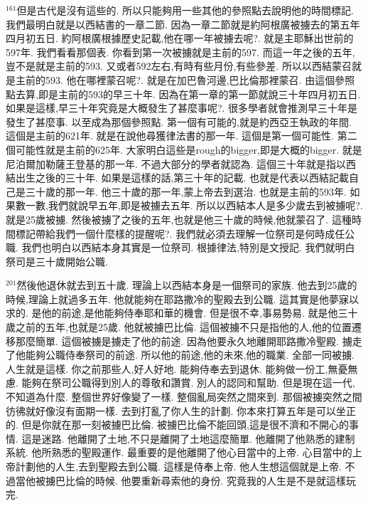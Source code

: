 \documentclass{book}
\begin{document}
$^{161}$但是古代是沒有這些的.
所以只能夠用一些其他的參照點去說明他的時間標記.
我們最明白就是以西結書的一章二節.
因為一章二節就是約阿根廣被擄去的第五年四月初五日.
約阿根廣根據歷史記載,他在哪一年被擄去呢?.
就是主耶穌出世前的597年.
我們看看那個表.
你看到第一次被擄就是主前的597.
而這一年之後的五年,豈不是就是主前的593.
又或者592左右,有時有些月份,有些參差.
所以以西結蒙召就是主前的593.
他在哪裡蒙召呢?.
就是在加巴魯河邊,巴比倫那裡蒙召.
由這個參照點去算,即是主前的593的早三十年.
因為在第一章的第一節就說三十年四月初五日.
如果是這樣,早三十年究竟是大概發生了甚麼事呢?.
很多學者就會推測早三十年是發生了甚麼事.
以至成為那個參照點.
第一個有可能的,就是約西亞王執政的年間.
這個是主前的621年.
就是在說他尋獲律法書的那一年.
這個是第一個可能性.
第二個可能性就是主前的625年.
大家明白這些是rough的bigger,即是大概的bigger.
就是尼泊爾加勒薩王登基的那一年.
不過大部分的學者就認為.
這個三十年就是指以西結出生之後的三十年.
如果是這樣的話,第三十年的記載.
也就是代表以西結記載自己是三十歲的那一年.
他三十歲的那一年,蒙上帝去到選治.
也就是主前的593年.
如果數一數,我們就說早五年,即是被擄去五年.
所以以西結本人是多少歲去到被擄呢?.
就是25歲被擄.
然後被擄了之後的五年,也就是他三十歲的時候,他就蒙召了.
這種時間標記帶給我們一個什麼樣的提醒呢?.
我們就必須去理解一位祭司是何時成任公職.
我們也明白以西結本身其實是一位祭司.
根據律法,特別是文授記.
我們就明白祭司是三十歲開始公職.

$^{201}$然後他退休就去到五十歲.
理論上以西結本身是一個祭司的家族.
他去到25歲的時候,理論上就過多五年.
他就能夠在耶路撒冷的聖殿去到公職.
這其實是他夢寐以求的.
是他的前途,是他能夠侍奉耶和華的機會.
但是很不幸,事易勢易.
就是他三十歲之前的五年,也就是25歲.
他就被擄巴比倫.
這個被擄不只是指他的人,他的位置遷移那麼簡單.
這個被擄是擄走了他的前途.
因為他要永久地離開耶路撒冷聖殿.
擄走了他能夠公職侍奉祭司的前途.
所以他的前途,他的未來,他的職業.
全部一同被擄.
人生就是這樣.
你之前那些人,好人好地.
能夠侍奉去到退休.
能夠做一份工,無憂無慮.
能夠在祭司公職得到別人的尊敬和讚賞.
別人的認同和幫助.
但是現在這一代,不知道為什麼.
整個世界好像變了一樣.
整個亂局突然之間來到.
那個被擄突然之間彷彿就好像沒有面期一樣.
去到打亂了你人生的計劃.
你本來打算五年是可以坐正的.
但是你就在那一刻被擄巴比倫.
被擄巴比倫不能回頭,這是很不濟和不開心的事情.
這是迷路.
他離開了土地,不只是離開了土地這麼簡單.
他離開了他熟悉的建制系統.
他所熟悉的聖殿運作.
最重要的是他離開了他心目當中的上帝.
心目當中的上帝計劃他的人生,去到聖殿去到公職.
這樣是侍奉上帝.
他人生想這個就是上帝.
不過當他被擄巴比倫的時候.
他要重新尋索他的身份.
究竟我的人生是不是就這樣玩完.
\end{document}

